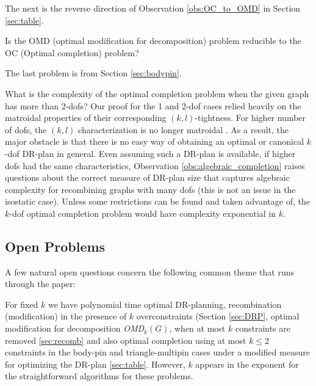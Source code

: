 The next is the reverse direction of Observation \ref{obs:OC_to_OMD} in Section \ref{sec:table}.

\begin{openproblem}
    Is the OMD (optimal modification for decomposition) problem
    reducible to the OC (Optimal completion) problem?
\end{openproblem}

The last problem is from
Section \ref{sec:bodypin}.

\begin{openproblem}
    What is the complexity of the optimal completion problem when the given
    graph has more than 2-dofs?
    Our proof for the 1 and 2-dof cases relied heavily on the matroidal
    properties of their corresponding $(k,l)$-tightness.
    For higher number of dofs, the $(k,l)$ characterization is
    no longer matroidal \cite{Lee:2007:PGA}.
    As a result, the major obstacle is that
    there is no easy way of obtaining an optimal or canonical
    $k$-dof DR-plan in general.
    Even assuming such  a DR-plan is available,
    if higher dofs had the same characteristics,
    Observation \ref{obs:algebraic_completion}
    raises questions about the correct measure of DR-plan size that
    captures algebraic complexity for recombining graphs with many dofs
    (this is not an issue in the isostatic case). Unless some restrictions
    can be found and taken advantage of, the $k$-dof optimal
    completion problem would  have complexity exponential in $k$.
\end{openproblem}




\subsection{Open Problems}


A few natural  open questions concern the following common theme
that runs through the paper:

\begin{openproblem}
For fixed $k$ we have polynomial time optimal DR-planning,
recombination (modification) in the presence of $k$ overconstraints (Section
\ref{sec:DRP},
optimal modification for decomposition {\sl OMD}$_k(G)$,
when at most $k$ constraints are removed
\ref{sec:recomb}
and
also optimal completion
using at most $k\le 2$ constraints in the body-pin and
triangle-multipin cases
under a modified measure for optimizing the
DR-plan \ref{sec:table}.
However, $k$ appears in the exponent for
the straightforward algorithms for these problems.
\end{openproblem}

